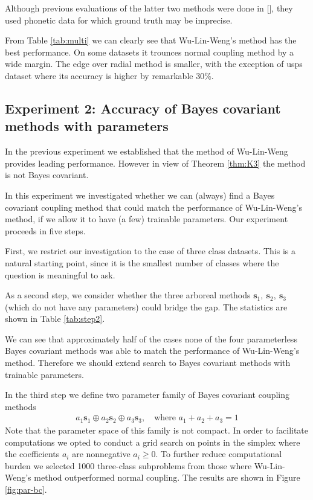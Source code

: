 \documentclass[twoside,11pt]{article}
\begin{document}
Although previous evaluations of the latter two methods were done in [\cite{vsuch2016bayes}], they used phonetic data for which ground truth may be imprecise. 



From Table \ref{tab:multi} we can clearly see that Wu-Lin-Weng's method has the best performance. On some datasets it trounces normal coupling method by a wide margin. The edge over radial method is smaller, with the exception of usps dataset where its accuracy is higher by remarkable 30\%. 



\subsection{Experiment 2: Accuracy of Bayes covariant methods with parameters}
 \label{sec:exp2}

In the previous experiment we established that the method of Wu-Lin-Weng provides leading performance. However in view of Theorem \ref{thm:K3} the method is not Bayes covariant. 

In this experiment we investigated whether we can (always) find  a Bayes covariant coupling method that could match the performance of Wu-Lin-Weng's method, if we allow it to have (a few) trainable parameters.  Our experiment proceeds in five steps. 

First, we restrict our investigation to the case of three class datasets. This is a natural starting point, since it is the smallest number of classes where the question is meaningful to ask. 

As a second step, we consider whether the three arboreal methods $ \boldsymbol{s}_1,~ \boldsymbol{s}_2,~ \boldsymbol{s}_3$ (which do not have any parameters) could bridge the gap. The statistics are shown in Table \ref{tab:step2}. 




We can see that approximately half of the cases none of the four parameterless Bayes covariant methods was able to match the performance of Wu-Lin-Weng's method. Therefore we should extend search to Bayes covariant methods with trainable parameters.


In the third step we define two parameter family of Bayes covariant coupling methods
\begin{align}
a_1 \boldsymbol{s}_1 \oplus a_2 \boldsymbol{s}_2 \oplus a_3 \boldsymbol{s}_3,\quad\textrm{where } a_1 + a_2 +a_3 = 1 \label{eq:family}
\end{align}
Note that the parameter space of this family is not compact. In order to facilitate computations we opted to conduct a grid search on points in the simplex where the coefficients $a_i$ are nonnegative $a_i \geq 0$.  To further reduce computational burden we selected 1000 three-class subproblems from those where Wu-Lin-Weng's method outperformed normal coupling. The results are shown in Figure \ref{fig:par-bc}.
\end{document}
